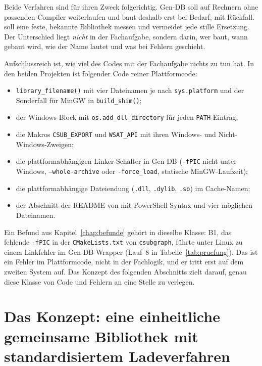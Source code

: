 Beide Verfahren sind für ihren Zweck folgerichtig. Gen-DB soll auf Rechnern ohne passenden Compiler weiterlaufen und baut deshalb erst bei Bedarf, mit Rückfall.  soll eine feste, bekannte Bibliothek messen und vermeidet jede stille Ersetzung. Der Unterschied liegt \emph{nicht} in der Fachaufgabe, sondern darin, wer baut, wann gebaut wird, wie der Name lautet und was bei Fehlern geschieht.

Aufschlussreich ist, wie viel des Codes mit der Fachaufgabe nichts zu tun hat. In den beiden Projekten ist folgender Code reiner Plattformcode:

\begin{itemize}
	\item \texttt{library\_filename()} mit vier Dateinamen je nach \texttt{sys.platform} und der Sonderfall für MinGW in \texttt{build\_shim()};
	\item der Windows-Block mit \texttt{os.add\_dll\_directory} für jeden \texttt{PATH}-Eintrag;
	\item die Makros \texttt{CSUB\_EXPORT} und \texttt{WSAT\_API} mit ihren Windows- und Nicht-Windows-Zweigen;
	\item die plattformabhängigen Linker-Schalter in Gen-DB (\texttt{-fPIC} nicht unter Windows, \texttt{--whole-archive} oder \texttt{-force\_load}, statische MinGW-Laufzeit);
	\item die plattformabhängige Dateiendung (\texttt{.dll}, \texttt{.dylib}, \texttt{.so}) im Cache-Namen;
	\item der Abschnitt der README von  mit PowerShell-Syntax und vier möglichen Dateinamen.
\end{itemize}

Ein Befund aus Kapitel~\ref{chap:befunde} gehört in dieselbe Klasse: B1, das fehlende \texttt{-fPIC} in der \texttt{CMakeLists.txt} von \texttt{csubgraph}, führte unter Linux zu einem Linkfehler im Gen-DB-Wrapper (Lauf~8 in Tabelle~\ref{tab:pruefung}). Das ist ein Fehler im Plattformcode, nicht in der Fachlogik, und er tritt erst auf dem zweiten System auf. Das Konzept des folgenden Abschnitts zielt darauf, genau diese Klasse von Code und Fehlern an eine Stelle zu verlegen.

\section{Das Konzept: eine einheitliche gemeinsame Bibliothek mit standardisiertem Ladeverfahren}
\label{sec:sl}

